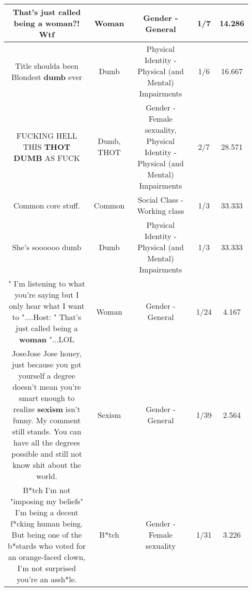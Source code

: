 \documentclass[11pt]{article}
\newlength\mylength
\begin{document}
\begin{center}
\begin{longtable}{|C{.65\mylength}|C{.30\mylength}|C{.12\mylength}|C{.12\mylength}|C{.12\mylength}|}
  \small That's just called being a \textbf{woman}?! Wtf\normalsize   & Woman & Gender - General & 1/7 & 14.286 \\  \hline
  \small Title shoulda been Blondest \textbf{dumb} ever\normalsize   & Dumb & Physical Identity - Physical (and Mental) Impairments & 1/6 & 16.667 \\  \hline
  \small FUCKING HELL THIS \textbf{THOT} \textbf{DUMB} AS FUCK\normalsize   & Dumb, THOT & Gender - Female sexuality, Physical Identity - Physical (and Mental) Impairments & 2/7 & 28.571 \\  \hline
  \small Common core stuff.\normalsize   & Common & Social Class - Working class & 1/3 & 33.333 \\  \hline
  \small She's soooooo dumb\normalsize   & Dumb & Physical Identity - Physical (and Mental) Impairments & 1/3 & 33.333 \\  \hline
  \small " I'm listening to what you're saying but I only hear what I want to "....Host: " That's just called being a \textbf{woman} "...LOL\normalsize   & Woman & Gender - General & 1/24 & 4.167 \\  \hline
  \small JoseJose Jose honey, just because you got yourself a degree doesn't mean you're smart enough to realize \textbf{sexism} isn't funny. My comment still stands. You can have all the degrees possible and still not know shit about the world.\normalsize   & Sexism & Gender - General & 1/39 & 2.564 \\  \hline
  \small B*tch I'm not "imposing my beliefs" I'm being a decent f*cking human being. But being one of the b*stards who voted for an orange-faced clown, I'm not surprised you're an assh*le.\normalsize   & B*tch & Gender - Female sexuality & 1/31 & 3.226 \\  \hline

\end{longtable}
\end{center}
\end{document}
